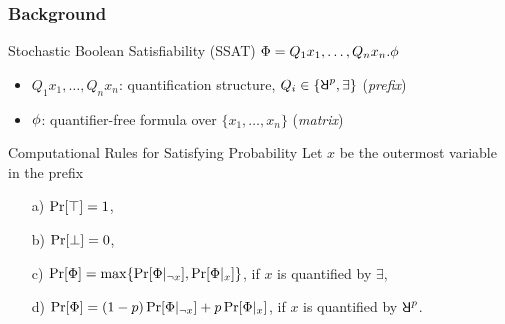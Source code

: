 \begin{frame}
    \frametitle{Background}
    \begin{block}{Stochastic Boolean Satisfiability (SSAT)}
        $\Phi=Q_1 x_1,\ldots,Q_n x_n.\phi$
        \pause
        \begin{itemize}
            \item $Q_1 x_1,\ldots,Q_n x_n$: quantification structure, $Q_i \in \{\random{p},\exists\}$ (\emph{prefix})
                  \pause
            \item $\phi$: quantifier-free formula over $\{x_1,\ldots,x_n\}$ (\emph{matrix})
        \end{itemize}
    \end{block}
    \pause
    \begin{block}{Computational Rules for Satisfying Probability}
        Let $x$ be the outermost variable in the prefix
        \pause
        \begin{enumerate}
            \item[a)] $\Pr[\top]=1$,
                  \pause
            \item[b)] $\Pr[\bot]=0$,
                  \pause
            \item[c)] $\Pr[\Phi]=\max\{\Pr[\Phi|_{\lnot x}],\Pr[\Phi|_{x}]\}$, if $x$ is quantified by $\exists$,
                  \pause
            \item[d)] $\Pr[\Phi]=(1-p)\Pr[\Phi|_{\lnot x}]+p\Pr[\Phi|_{x}]$, if $x$ is quantified by $\random{p}$.
        \end{enumerate}
    \end{block}
\end{frame}


